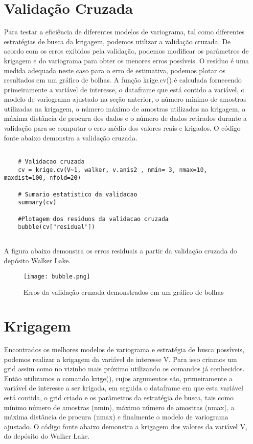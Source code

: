 \section{Validação Cruzada} 

Para testar a eficiência de diferentes modelos de variograma, tal como diferentes estratégias de busca da krigagem, podemos utilizar a validação cruzada. De acordo com os erros exibidos pela validação, podemos modificar os parâmetros de krigagem e do variograma para obter os menores erros possíveis. O resíduo é uma medida adequada neste caso para o erro de estimativa, podemos plotar os resultados em um gráfico de bolhas. A função krige.cv() é calculada fornecendo primeiramente a variável de interesse, o dataframe que está contido a variável, o modelo de variograma ajustado na seção anterior, o número mínimo de amostras utilizadas na krigagem, o número máximo de amostras utilizadas na krigagem, a máxima distância de procura dos dados e o número de dados retirados durante a validação para se computar o erro médio dos valores reais e krigados. O código fonte abaixo demonstra a validação cruzada.  

\begin{scriptsize}
	\estiloR
	\begin{lstlisting}[caption={Criação de um vetor em R}, label=lst:rcode]
	
	# Validacao cruzada
	cv = krige.cv(V~1, walker, v.anis2 , nmin= 3, nmax=10, maxdist=100, nfold=20)
	
	# Sumario estatistico da validacao
	summary(cv)
	
	#Plotagem dos residuos da validacao cruzada
	bubble(cv["residual"])
	
	\end{lstlisting}
\end{scriptsize}

A figura abaixo demonstra os erros residuais a partir da validação cruzada do depósito Walker Lake. 

\FloatBarrier
\begin{figure}[H]
	\centering
	\texttt{[image: bubble.png]}	
	\caption{Erros da validação cruzada demonstrados em um gráfico de bolhas}
	\label{walk}
\end{figure}
\FloatBarrier

\section{Krigagem} 

Encontrados os melhores modelos de variograma e estratégia de busca possíveis, podemos realizar a krigagem da variável de interesse V. Para isso criamos um grid assim como no vizinho mais próximo utilizando os comandos já conhecidos. Então utilizamos o comando krige(), cujos argumentos são, primeiramente a variável de interesse a ser krigada, em seguida o dataframe em que esta variável está contida, o grid criado e os parâmetros da estratégia de busca, tais como mínimo número de amostras (nmin), máximo número de amostras (nmax), a máxima distância de procura (nmax) e finalmente o modelo de variograma ajustado. O código fonte abaixo demonstra a krigagem dos valores da variável V, do depósito do Walker Lake. 


